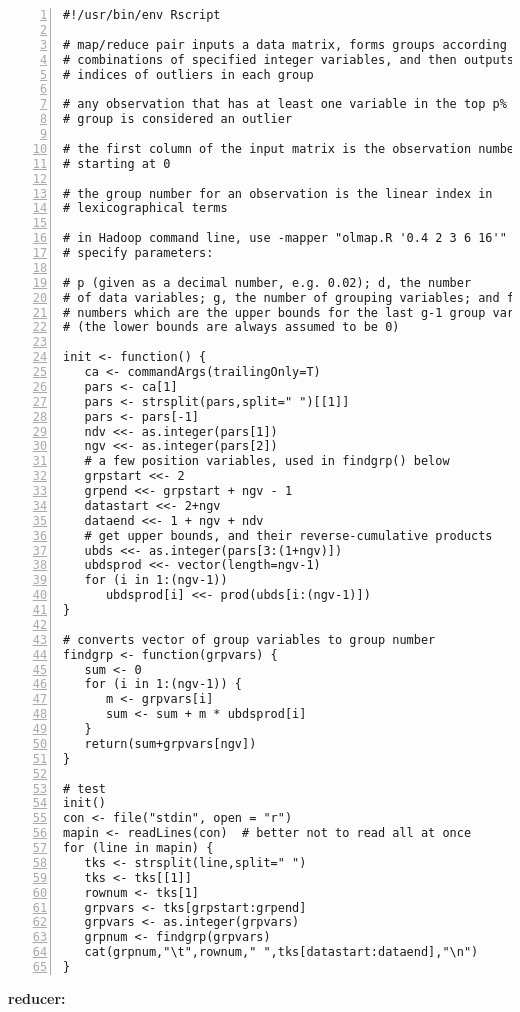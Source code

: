 \begin{lstlisting}[numbers=left]
#!/usr/bin/env Rscript

# map/reduce pair inputs a data matrix, forms groups according to
# combinations of specified integer variables, and then outputs the
# indices of outliers in each group

# any observation that has at least one variable in the top p% of its
# group is considered an outlier

# the first column of the input matrix is the observation number,
# starting at 0

# the group number for an observation is the linear index in
# lexicographical terms

# in Hadoop command line, use -mapper "olmap.R '0.4 2 3 6 16'" to
# specify parameters:

# p (given as a decimal number, e.g. 0.02); d, the number
# of data variables; g, the number of grouping variables; and finally g
# numbers which are the upper bounds for the last g-1 group variables
# (the lower bounds are always assumed to be 0)

init <- function() {
   ca <- commandArgs(trailingOnly=T)
   pars <- ca[1]
   pars <- strsplit(pars,split=" ")[[1]]
   pars <- pars[-1]
   ndv <<- as.integer(pars[1])
   ngv <<- as.integer(pars[2])
   # a few position variables, used in findgrp() below
   grpstart <<- 2
   grpend <<- grpstart + ngv - 1
   datastart <<- 2+ngv
   dataend <<- 1 + ngv + ndv
   # get upper bounds, and their reverse-cumulative products
   ubds <<- as.integer(pars[3:(1+ngv)])
   ubdsprod <<- vector(length=ngv-1)
   for (i in 1:(ngv-1)) 
      ubdsprod[i] <<- prod(ubds[i:(ngv-1)])
}

# converts vector of group variables to group number
findgrp <- function(grpvars) {
   sum <- 0
   for (i in 1:(ngv-1)) {
      m <- grpvars[i]
      sum <- sum + m * ubdsprod[i] 
   }
   return(sum+grpvars[ngv])
}

# test 
init()
con <- file("stdin", open = "r") 
mapin <- readLines(con)  # better not to read all at once
for (line in mapin) {
   tks <- strsplit(line,split=" ")
   tks <- tks[[1]]
   rownum <- tks[1]
   grpvars <- tks[grpstart:grpend]
   grpvars <- as.integer(grpvars)
   grpnum <- findgrp(grpvars)
   cat(grpnum,"\t",rownum," ",tks[datastart:dataend],"\n")
}
\end{lstlisting}

{\bf reducer:}

